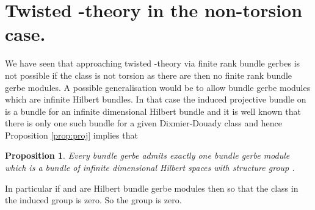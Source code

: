 \documentclass[a4paper,reqno]{amsart}
\theoremstyle{plain}
\newtheorem{proposition}[theorem]{Proposition}
\theoremstyle{definition}
\theoremstyle{remark}
\numberwithin{equation}{section}
\numberwithin{figure}{section}
\providecommand{\cH}{{\mathcal H}}
\providecommand{\<}{\langle}
\renewcommand{\>}{\rangle}
\begin{document}
\section{Twisted \coordHE{}-theory in the  non-torsion case.}
\label{sec:non-torsion case} 

We have seen that approaching twisted \coordHE{}-theory via finite rank
bundle gerbes is not possible if the class \myHighlight{$[H]$}\coordHE{}
is not torsion as there are then no finite rank bundle gerbe modules.
A possible
generalisation would be to allow bundle gerbe modules which
are infinite Hilbert bundles. In that case the induced
projective bundle on \coordHE{} is a \myHighlight{$PU(\cH)$}\coordHE{} bundle for \myHighlight{$\cH$}\coordHE{}
an infinite dimensional Hilbert bundle and it is well
known that there is only one such bundle for a given
Dixmier-Douady class and hence Proposition \ref{prop:proj}
implies that

\begin{proposition}
Every bundle gerbe admits exactly one bundle gerbe module which is a
bundle of infinite dimensional Hilbert spaces  with structure group \myHighlight{$U(\cH)$}\coordHE{}.
\end{proposition}


In particular if \coordHE{} and \coordHE{} are Hilbert bundle gerbe modules
then \coordHE{} so that the class \coordHE{} in the induced
\coordHE{} group is zero. So the \coordHE{} group is zero.
\end{document}
